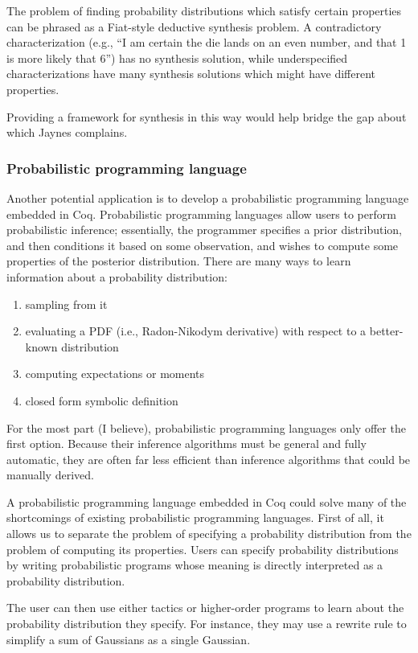 \documentclass{article}           %
\begin{document}
The problem of finding probability distributions which satisfy certain properties can be phrased as a Fiat-style deductive synthesis problem. A contradictory characterization (e.g., ``I am certain the die lands on an even number, and that 1 is more likely that 6'') has no synthesis solution, while underspecified characterizations have many synthesis solutions which might have different properties.

Providing a framework for synthesis in this way would help bridge the gap about which Jaynes complains.

\subsubsection{Probabilistic programming language}

Another potential application is to develop a probabilistic programming language embedded in Coq. Probabilistic programming languages allow users to perform probabilistic inference; essentially, the programmer specifies a prior distribution, and then conditions it based on some observation, and wishes to compute some properties of the posterior distribution. There are many ways to learn information about a probability distribution:

\begin{enumerate}
\item sampling from it
\item evaluating a PDF (i.e., Radon-Nikodym derivative) with respect to a better-known distribution
\item computing expectations or moments
\item closed form symbolic definition
\end{enumerate}

For the most part (I believe), probabilistic programming languages only offer the first option. Because their inference algorithms must be general and fully automatic, they are often far less efficient than inference algorithms that could be manually derived.

A probabilistic programming language embedded in Coq could solve many of the shortcomings of existing probabilistic programming languages. First of all, it allows us to separate the problem of specifying a probability distribution from the problem of computing its properties. Users can specify probability distributions by writing probabilistic programs whose meaning is directly interpreted as a probability distribution.

The user can then use either tactics or higher-order programs to learn about the probability distribution they specify. For instance, they may use a rewrite rule to simplify a sum of Gaussians as a single Gaussian.
\end{document}

